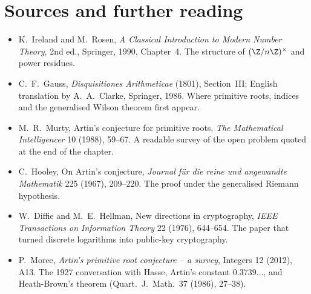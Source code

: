 \section*{Sources and further reading}

\begin{itemize}
\item K.~Ireland and M.~Rosen, \emph{A Classical Introduction to Modern Number Theory}, 2nd ed., Springer, 1990, Chapter~4. The structure of $(\Z/n\Z)^\times$ and power residues.
\item C.~F.~Gauss, \emph{Disquisitiones Arithmeticae} (1801), Section~III; English translation by A.~A.~Clarke, Springer, 1986. Where primitive roots, indices and the generalised Wilson theorem first appear.
\item M.~R.~Murty, Artin's conjecture for primitive roots, \emph{The Mathematical Intelligencer} 10 (1988), 59--67. A readable survey of the open problem quoted at the end of the chapter.
\item C.~Hooley, On Artin's conjecture, \emph{Journal f\"ur die reine und angewandte Mathematik} 225 (1967), 209--220. The proof under the generalised Riemann hypothesis.
\item W.~Diffie and M.~E.~Hellman, New directions in cryptography, \emph{IEEE Transactions on Information Theory} 22 (1976), 644--654. The paper that turned discrete logarithms into public-key cryptography.
\item P.~Moree, \emph{Artin's primitive root conjecture -- a survey}, Integers 12 (2012), A13. The 1927 conversation with Hasse, Artin's constant $0.3739\ldots$, and Heath-Brown's theorem (Quart.\ J.\ Math.\ 37 (1986), 27--38).
\end{itemize}
